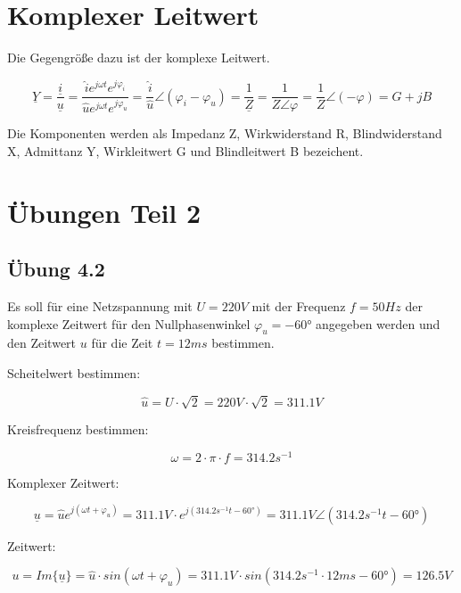 \documentclass[
  ngerman,
  letterpaper,
]{scrbook}
\begin{document}
\section{Komplexer Leitwert}\label{komplexer-leitwert}

Die Gegengröße dazu ist der komplexe Leitwert.

\[
\underline{Y} = \frac{\underline{i}}{\underline{u}} = \frac{\hat{i} e^{j\omega t}e^{j\varphi_i}}{\hat{u} e^{j\omega
t}e^{j\varphi_u}} = \frac{\hat{i}}{\hat{u}} \angle(\varphi_i - \varphi_u) = \frac{1}{\underline{Z}} = \frac{1}{Z \angle
\varphi} = \frac{1}{Z} \angle(-\varphi) = G + j B
\]

Die Komponenten werden als Impedanz Z, Wirkwiderstand R, Blindwiderstand
X, Admittanz Y, Wirkleitwert G und Blindleitwert B bezeichent.

\section{Übungen Teil 2}\label{uxfcbungen-teil-2}

\subsection{Übung 4.2}\label{uxfcbung-4.2}

Es soll für eine Netzspannung mit \(U = 220V\) mit der Frequenz
\(f = 50Hz\) der komplexe Zeitwert für den Nullphasenwinkel
\(\varphi_u = -60°\) angegeben werden und den Zeitwert \(u\) für die
Zeit \(t = 12 ms\) bestimmen.

\begin{tcolorbox}[enhanced jigsaw, titlerule=0mm, rightrule=.15mm, toprule=.15mm, colback=white, toptitle=1mm, bottomrule=.15mm, coltitle=black, leftrule=.75mm, arc=.35mm, colbacktitle=quarto-callout-caution-color!10!white, opacityback=0, bottomtitle=1mm, colframe=quarto-callout-caution-color-frame, opacitybacktitle=0.6, breakable, title=\textcolor{quarto-callout-caution-color}{\faFire}\hspace{0.5em}{Lösung 4.2}, left=2mm]

Scheitelwert bestimmen:

\[
\hat{u} = U \cdot \sqrt{2} = 220V \cdot \sqrt{2} = 311.1V
\]

Kreisfrequenz bestimmen:

\[
\omega = 2 \cdot \pi \cdot f = 314.2 s^{-1}
\]

Komplexer Zeitwert:

\[
\underline{u} = \hat{u} e^{j(\omega t + \varphi_u)} = 311.1 V \cdot e^{j(314.2 s^{-1} t - 60°)} = 311.1 V \angle(314.2 s^{-1} t - 60°)
\]

Zeitwert:

\[
u = Im\{\underline{u}\} = \hat{u} \cdot sin(\omega t + \varphi_u) = 311.1V \cdot sin(314.2 s^{-1} \cdot 12 ms - 60°) = 126.5V
\]

\end{tcolorbox}
\end{document}
